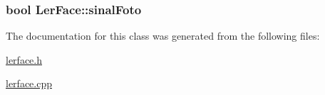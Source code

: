 \subsubsection[{\texorpdfstring{sinal\+Foto}{sinalFoto}}]{\setlength{\rightskip}{0pt plus 5cm}bool Ler\+Face\+::sinal\+Foto}\hypertarget{classLerFace_a2de1b8f2ac4b033efedc0495b2256248}{}\label{classLerFace_a2de1b8f2ac4b033efedc0495b2256248}


The documentation for this class was generated from the following files\+:\begin{DoxyCompactItemize}
\item 
\hyperlink{lerface_8h}{lerface.\+h}\item 
\hyperlink{lerface_8cpp}{lerface.\+cpp}\end{DoxyCompactItemize}
